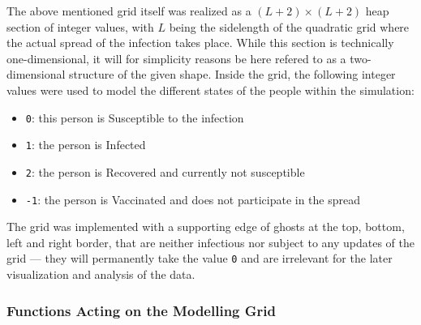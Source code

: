 The above mentioned grid itself was realized as a $\left(L+2\right)\times \left(L+2\right)$ heap section of integer values, with $L$ being the sidelength of the quadratic grid where the actual spread of the
infection takes place. While this section is technically one-dimensional, it will for simplicity reasons be here refered to as a two-dimensional structure of the given shape. 
Inside the grid, the following integer values were used to model the different states of the people within the simulation:
\begin{itemize}
    \item \texttt{0}: this person is Susceptible \susceptible{} to the infection
    \item \texttt{1}: the person is Infected \infected{}
    \item \texttt{2}: the person is Recovered \recovered{} and currently not susceptible
    \item \texttt{-1}: the person is Vaccinated \vaccinated{} and does not participate in the spread
\end{itemize}
The grid was implemented with a supporting edge of ghosts at the top, bottom, left and right border, that are neither infectious nor subject to any updates of the grid --- they will permanently take the value
\texttt{0} and are irrelevant for the later visualization and analysis of the data.


\subsubsection{Functions Acting on the Modelling Grid}\label{ssec:impl_functions_on_grid}

